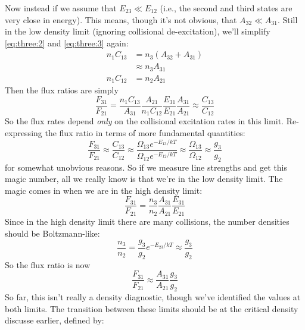\documentclass[10pt]{article}
\numberwithin{equation}{section}
\newcommand{\n}{\noindent}
\begin{document}
\n Now instead if we assume that $E_{23} \ll E_{12}$ (i.e., the second and third states are very close in energy). This means, though it's not obvious, that $A_{32} \ll A_{31}$. Still in the low density limit (ignoring collisional de-excitation), we'll simplify \eqref{eq:three:2} and \eqref{eq:three:3} again:
\begin{align}
  \label{eq:three:14} n_1 C_{13} &= n_3(A_{32} + A_{31})\\
  \label{eq:three:15} & \approx n_3A_{31}\\
  \label{eq:three:16} n_1 C_{12} &= n_2 A_{21}
\end{align}
Then the flux ratios are simply
\begin{equation}
  \label{eq:three:17} \frac{F_{31}}{F_{21}} = \frac{n_1 C_{13}}{A_{31}} \frac{A_{21}}{n_1 C_{12}} \frac{E_{31}}{E_{21}} \frac{A_{31}}{A_{21}} \approx \frac{C_{13}}{C_{12}}
\end{equation}
So the flux rates depend \emph{only} on the collisional excitation rates in this limit. Re-expressing the flux ratio in terms of more fundamental quantities:
\begin{equation}
  \label{eq:three:18} \frac{F_{31}}{F_{21}} \approx \frac{C_{13}}{C_{12}} \approx \frac{\Omega_{13} e^{-E_{13}/kT}}{\Omega_{12} e^{-E_{12}/kT}} \approx \frac{\Omega_{13}}{\Omega_{12}} \approx \frac{g_{3}}{g_2}
\end{equation}
for somewhat unobvious reasons. So if we measure line strengths and get this magic number, all we really know is that we're in the low density limit. The magic comes in when we are in the high density limit:
\begin{equation}
  \label{eq:three:19} \frac{F_{31}}{F_{21}} = \frac{n_3}{n_2} \frac{A_{31}}{A_{21}} \frac{E_{31}}{E_{21}}
\end{equation}
Since in the high density limit there are many collisions, the number densities should be Boltzmann-like:
\begin{equation}
  \label{eq:three:20} \frac{n_3}{n_2} = \frac{g_3}{g_2} e^{-E_{23}/kT}\approx \frac{g_3}{g_2}
\end{equation}
So the flux ratio is now
\begin{equation}
  \label{eq:three:21} \frac{F_{31}}{F_{21}} \approx \frac{A_{31}}{A_{21}}\frac{g_3}{g_2}
\end{equation}
So far, this isn't really a density diagnostic, though we've identified the values at both limits. The transition between these limits should be at the critical density discusse earlier, defined by:
\end{document}
